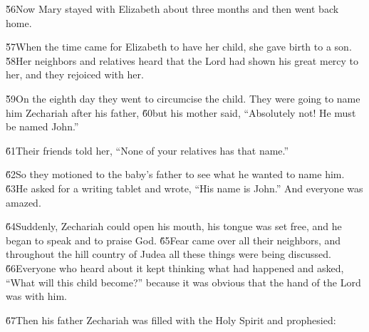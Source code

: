 \v{56}Now Mary stayed with Elizabeth about three months and then went back home.

\v{57}When the time came for Elizabeth to have her child, she gave birth to a son. \v{58}Her neighbors and relatives heard that the Lord had shown his great mercy to her, and they rejoiced with her.

\v{59}On the eighth day they went to circumcise the child. They were going to name him Zechariah after his father, \v{60}but his mother said, ``Absolutely not! He must be named John.''

\v{61}Their friends told her, ``None of your relatives has that name.''

\v{62}So they motioned to the baby's father to see what he wanted to name him. \v{63}He asked for a writing tablet and wrote, ``His name is John.'' And everyone was amazed.

\v{64}Suddenly, Zechariah could open his mouth, his tongue was set free, and he began to speak and to praise God. \v{65}Fear came over all their neighbors, and throughout the hill country of Judea all these things were being discussed. \v{66}Everyone who heard about it kept thinking what had happened and asked, ``What will this child become?'' because it was obvious that the hand of the Lord was with him.

\v{67}Then his father Zechariah was filled with the Holy Spirit and prophesied:

